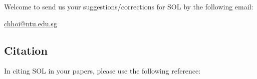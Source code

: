 \documentclass[11pt,a4paper]{article}
\begin{document}
Welcome to send us your suggestions/corrections for SOL by the following email:
\begin{center}\url{chhoi@ntu.edu.sg}\end{center}

\subsection*{Citation}
In citing SOL in your papers, please use the following reference:\\







\end{document}
